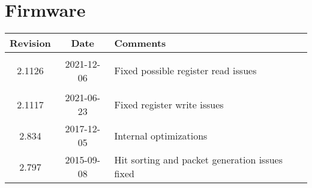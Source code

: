 \section{Firmware}
\begin{tabularx}{\textwidth}{|c|c|X|}
    \hline
    Revision & Date & Comments\\
    \hline\hline
    \hypertarget{fwrev}{2.1126} & 2021-12-06 & Fixed possible register read issues\\
	\hline
	2.1117 & 2021-06-23 & Fixed register write issues\\
	\hline
	2.834 & 2017-12-05 & Internal optimizations\\
    \hline
    2.797 & 2015-09-08 & Hit sorting and packet generation issues fixed\\
    \hline
\end{tabularx}